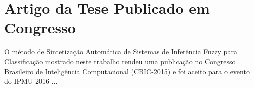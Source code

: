 
\appendix
\chapter{Artigo da Tese Publicado em Congresso}

O método de Sintetização Automática de Sistemas de Inferência Fuzzy para Classificação mostrado neste trabalho rendeu uma publicação no Congresso Brasileiro de Inteligência Computacional (CBIC-2015) e foi aceito para o evento do IPMU-2016 ...

